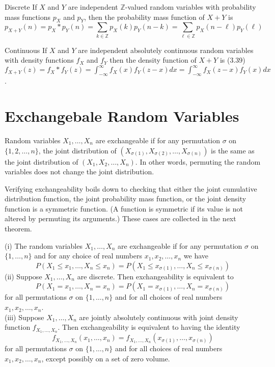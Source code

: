 \documentclass[11pt]{elegantbook}
\begin{document}
\begin{theorem}{Discrete}
If $X$ and $Y$ are independent $\mathbb{Z}$-valued random variables with probability mass functions $p_X$ and $p_Y$, then the probability mass function of $X+Y$ is
$$
p_{X+Y}(n)=p_X * p_Y(n)=\sum_{k \in \mathbb{Z}} p_X(k) p_Y(n-k)=\sum_{\ell \in \mathbb{Z}} p_X(n-\ell) p_Y(\ell)
$$
\end{theorem}

\begin{theorem}{Continuous}
If $X$ and $Y$ are independent absolutely continuous random variables with density functions $f_X$ and $f_Y$ then the density function of $X+Y$ is
(3.39) $f_{X+Y}(z)=f_X * f_Y(z)=\int_{-\infty}^{\infty} f_X(x) f_Y(z-x) d x=\int_{-\infty}^{\infty} f_X(z-x) f_Y(x) d x$.
\end{theorem}

\section{Exchangebale Random Variables}
\begin{definition}
 Random variables $X_1, \ldots, X_n$ are exchangeable if for any permutation $\sigma$ on $\{1,2, \ldots, n\}$, the joint distribution of $\left(X_{\sigma(1)}, X_{\sigma(2)}, \ldots, X_{\sigma(n)}\right)$ is the same as the joint distribution of $\left(X_1, X_2, \ldots, X_n\right)$. In other words, permuting the random variables does not change the joint distribution.
\end{definition}
\begin{note}
    Verifying exchangeability boils down to checking that either the joint cumulative distribution function, the joint probability mass function, or the joint density function is a symmetric function. (A function is symmetric if its value is not altered by permuting its arguments.) These cases are collected in the next theorem.
\end{note}

\begin{theorem}
    (i) The random variables $X_1, \ldots, X_n$ are exchangeable if for any permutation $\sigma$ on $\{1, \ldots, n\}$ and for any choice of real numbers $x_1, x_2, \ldots, x_n$ we have
$$
P\left(X_1 \leq x_1, \ldots, X_n \leq x_n\right)=P\left(X_1 \leq x_{\sigma(1)}, \ldots, X_n \leq x_{\sigma(n)}\right)
$$
(ii) Suppose $X_1, \ldots, X_n$ are discrete. Then exchangeability is equivalent to
$$
P\left(X_1=x_1, \ldots, X_n=x_n\right)=P\left(X_1=x_{\sigma(1)}, \ldots, X_n=x_{\sigma(n)}\right)
$$
for all permutations $\sigma$ on $\{1, \ldots, n\}$ and for all choices of real numbers $x_1, x_2, \ldots, x_n$.\\
(iii) Suppose $X_1, \ldots, X_n$ are jointly absolutely continuous with joint density function $f_{X_1, \ldots, X_n}$. Then exchangeability is equivalent to having the identity
$$
f_{X_1, \ldots, X_n}\left(x_1, \ldots, x_n\right)=f_{X_1, \ldots, X_n}\left(x_{\sigma(1)}, \ldots, x_{\sigma(n)}\right)
$$
for all permutations $\sigma$ on $\{1, \ldots, n\}$ and for all choices of real numbers $x_1, x_2, \ldots, x_n$, except possibly on a set of zero volume.
\end{theorem}
\end{document}
